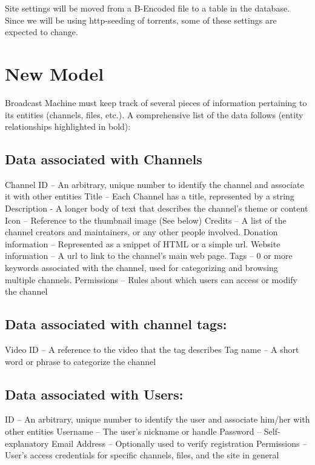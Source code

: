 \documentclass[a4paper,12pt]{report}
\begin{document}
Site settings will be moved from a B-Encoded file to a table in the database. Since we will be using http-seeding of torrents, some of these settings are expected to change.


\section{New Model}
Broadcast Machine must keep track of several pieces of information pertaining to its entities (channels, files, etc.).
A comprehensive list of the data follows (entity relationships highlighted in bold):


\subsection{Data associated with Channels}
Channel ID – An arbitrary, unique number to identify the channel and  associate it with other entities
Title – Each Channel has a title, represented by a string
Description - A longer body of text that describes the channel's theme or content
Icon – Reference to the thumbnail image (See below)
Credits – A list of the channel creators and maintainers, or any other people involved.
Donation information – Represented as a snippet of HTML or a simple url.
Website information – A url to link to the channel's main web page.
Tags – 0 or more keywords associated with the channel, used for categorizing and browsing multiple channels.
Permissions – Rules about which users can access or modify the channel


\subsection{Data associated with channel tags:}
Video ID – A reference to the video that the tag describes
Tag name – A short word or phrase to categorize the channel


\subsection{Data associated with Users:}
ID – An arbitrary, unique number to identify the user and associate him/her with other entities
Username – The user's nickname or handle
Password – Self-explanatory
Email Address – Optionally used to verify registration
Permissions – User's access credentials for specific channels, files, and the site in general
\end{document}
